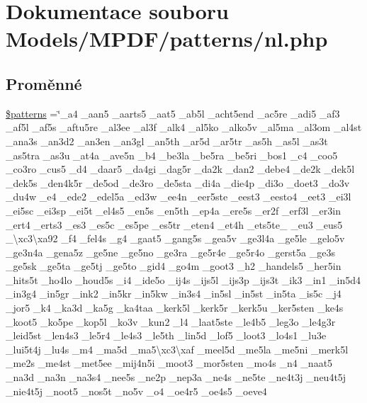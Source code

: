 \hypertarget{nl_8php}{\section{Dokumentace souboru Models/\-M\-P\-D\-F/patterns/nl.php}
\label{nl_8php}
}
\subsection*{Proměnné}
\begin{DoxyCompactItemize}
\item 
\hyperlink{nl_8php_a99c668c59ad650ca9b31ad5313dc5720}{\$patterns} =\char`\"{}\-\_\-a4 \-\_\-aan5 \-\_\-aarts5 \-\_\-aat5 \-\_\-ab5l \-\_\-acht5end \-\_\-ac5re \-\_\-adi5 \-\_\-af3 \-\_\-af5l \-\_\-af5s \-\_\-aftu5re \-\_\-al3ee \-\_\-al3f \-\_\-alk4 \-\_\-al5ko \-\_\-alko5v \-\_\-al5ma \-\_\-al3om \-\_\-al4st \-\_\-ana3s \-\_\-an3d2 \-\_\-an3en \-\_\-an3gl \-\_\-an5th \-\_\-ar5d \-\_\-ar5tr \-\_\-as5h \-\_\-as5l \-\_\-as3t \-\_\-as5tra \-\_\-as3u \-\_\-at4a \-\_\-ave5n \-\_\-b4 \-\_\-be3la \-\_\-be5ra \-\_\-be5ri \-\_\-bos1 \-\_\-c4 \-\_\-coo5 \-\_\-co3ro \-\_\-cus5 \-\_\-d4 \-\_\-daar5 \-\_\-da4gi \-\_\-dag5r \-\_\-da2k \-\_\-dan2 \-\_\-debe4 \-\_\-de2k \-\_\-dek5l \-\_\-dek5s \-\_\-den4k5r \-\_\-de5od \-\_\-de3ro \-\_\-de5sta \-\_\-di4a \-\_\-die4p \-\_\-di3o \-\_\-doet3 \-\_\-do3v \-\_\-du4w \-\_\-e4 \-\_\-ede2 \-\_\-edel5a \-\_\-ed3w \-\_\-ee4n \-\_\-eer5ste \-\_\-eest3 \-\_\-eesto4 \-\_\-eet3 \-\_\-ei3l \-\_\-ei5sc \-\_\-ei3sp \-\_\-ei5t \-\_\-el4s5 \-\_\-en5s \-\_\-en5th \-\_\-ep4a \-\_\-ere5s \-\_\-er2f \-\_\-erf3l \-\_\-er3in \-\_\-ert4 \-\_\-erts3 \-\_\-es3 \-\_\-es5c \-\_\-es5pe \-\_\-es5tr \-\_\-eten4 \-\_\-et4h \-\_\-ets5te\-\_\- \-\_\-eu3 \-\_\-eus5 \-\_\-\textbackslash{}xc3\textbackslash{}xa92 \-\_\-f4 \-\_\-fel4s \-\_\-g4 \-\_\-gaat5 \-\_\-gang5s \-\_\-gea5v \-\_\-ge3l4a \-\_\-ge5le \-\_\-gelo5v \-\_\-ge3n4a \-\_\-gena5z \-\_\-ge5ne \-\_\-ge5no \-\_\-ge3ra \-\_\-ge5r4e \-\_\-ge5r4o \-\_\-gerst5a \-\_\-ge3s \-\_\-ge5sk \-\_\-ge5ta \-\_\-ge5tj \-\_\-ge5to \-\_\-gid4 \-\_\-go4m \-\_\-goot3 \-\_\-h2 \-\_\-handels5 \-\_\-her5in \-\_\-hits5t \-\_\-ho4lo \-\_\-houd5s \-\_\-i4 \-\_\-ide5o \-\_\-ij4s \-\_\-ijs5l \-\_\-ijs3p \-\_\-ijs3t \-\_\-ik3 \-\_\-in1 \-\_\-in5d4 \-\_\-in3g4 \-\_\-in5gr \-\_\-ink2 \-\_\-in5kr \-\_\-in5kw \-\_\-in3s4 \-\_\-in5sl \-\_\-in5st \-\_\-in5ta \-\_\-is5c \-\_\-j4 \-\_\-jor5 \-\_\-k4 \-\_\-ka3d \-\_\-ka5g \-\_\-ka4taa \-\_\-kerk5l \-\_\-kerk5r \-\_\-kerk5u \-\_\-ker5sten \-\_\-ke4s \-\_\-koot5 \-\_\-ko5pe \-\_\-kop5l \-\_\-ko3v \-\_\-kun2 \-\_\-l4 \-\_\-laat5ste \-\_\-le4b5 \-\_\-leg3o \-\_\-le4g3r \-\_\-leid5st \-\_\-len4s3 \-\_\-le5r4 \-\_\-le4s3 \-\_\-le5th \-\_\-lin5d \-\_\-lof5 \-\_\-loot3 \-\_\-lo4s1 \-\_\-lu3e \-\_\-lui5t4j \-\_\-lu4s \-\_\-m4 \-\_\-ma5d \-\_\-ma5\textbackslash{}xc3\textbackslash{}xaf \-\_\-meel5d \-\_\-me5la \-\_\-me5ni \-\_\-merk5l \-\_\-me2s \-\_\-me4st \-\_\-met5ee \-\_\-mij4n5i \-\_\-moot3 \-\_\-mor5sten \-\_\-mo4s \-\_\-n4 \-\_\-naat5 \-\_\-na3d \-\_\-na3n \-\_\-na3s4 \-\_\-nee5s \-\_\-ne2p \-\_\-nep3a \-\_\-ne4s \-\_\-ne5te \-\_\-ne4t3j \-\_\-neu4t5j \-\_\-nie4t5j \-\_\-noot5 \-\_\-nos5t \-\_\-no5v \-\_\-o4 \-\_\-oe4r5 \-\_\-oe4s5 \-\_\-oeve4 
\end{DoxyCompactItemize}
